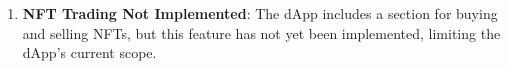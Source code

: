 \documentclass[../main.tex]{subfiles}
\begin{document}
\begin{enumerate}
    \item \textbf{NFT Trading Not Implemented}: The dApp includes a section for buying and selling NFTs, but this feature has not yet been implemented, limiting the dApp’s current scope.

\end{enumerate}
\end{document}
